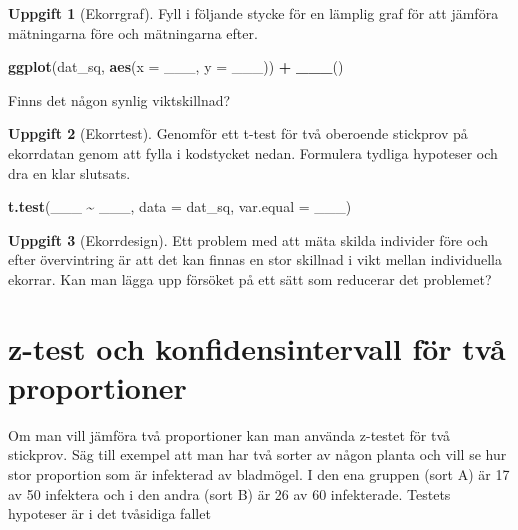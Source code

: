 \documentclass[
]{book}
\newenvironment{Shaded}{\begin{snugshade}}{\end{snugshade}}
\newcommand{\AttributeTok}[1]{\textcolor[rgb]{0.13,0.29,0.53}{#1}}
\newcommand{\FunctionTok}[1]{\textcolor[rgb]{0.13,0.29,0.53}{\textbf{#1}}}
\newcommand{\NormalTok}[1]{#1}
\newcommand{\SpecialCharTok}[1]{\textcolor[rgb]{0.81,0.36,0.00}{\textbf{#1}}}
\theoremstyle{definition}
\theoremstyle{definition}
\theoremstyle{definition}
\newtheorem{exercise}{Uppgift}[chapter]
\theoremstyle{definition}
\theoremstyle{remark}
\begin{document}
\begin{exercise}[Ekorrgraf]
Fyll i följande stycke för en lämplig graf för att jämföra mätningarna före och mätningarna efter.

\begin{Shaded}
\begin{Highlighting}[]
\FunctionTok{ggplot}\NormalTok{(dat\_sq, }\FunctionTok{aes}\NormalTok{(}\AttributeTok{x =}\NormalTok{ \_\_\_, }\AttributeTok{y =}\NormalTok{ \_\_\_)) }\SpecialCharTok{+}
  \FunctionTok{\_\_\_}\NormalTok{()}
\end{Highlighting}
\end{Shaded}

Finns det någon synlig viktskillnad?
\end{exercise}

\begin{exercise}[Ekorrtest]

Genomför ett t-test för två oberoende stickprov på ekorrdatan genom att fylla i kodstycket nedan. Formulera tydliga hypoteser och dra en klar slutsats.

\begin{Shaded}
\begin{Highlighting}[]
\FunctionTok{t.test}\NormalTok{(\_\_\_ }\SpecialCharTok{\textasciitilde{}}\NormalTok{ \_\_\_, }\AttributeTok{data =}\NormalTok{ dat\_sq, }\AttributeTok{var.equal =}\NormalTok{ \_\_\_)}
\end{Highlighting}
\end{Shaded}

\end{exercise}

\begin{exercise}[Ekorrdesign]
Ett problem med att mäta skilda individer före och efter övervintring är att det kan finnas en stor skillnad i vikt mellan individuella ekorrar. Kan man lägga upp försöket på ett sätt som reducerar det problemet?
\end{exercise}

\hypertarget{z-test-och-konfidensintervall-fuxf6r-tvuxe5-proportioner}{%
\section{z-test och konfidensintervall för två proportioner}\label{z-test-och-konfidensintervall-fuxf6r-tvuxe5-proportioner}}

Om man vill jämföra två proportioner kan man använda z-testet för två stickprov. Säg till exempel att man har två sorter av någon planta och vill se hur stor proportion som är infekterad av bladmögel. I den ena gruppen (sort A) är 17 av 50 infektera och i den andra (sort B) är 26 av 60 infekterade. Testets hypoteser är i det tvåsidiga fallet
\end{document}
